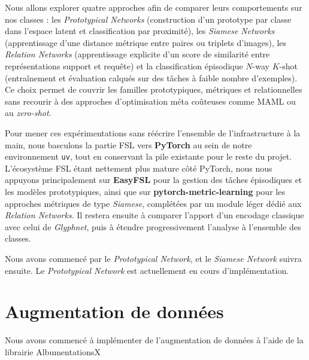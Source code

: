 \documentclass[11pt,a4paper]{article}
\begin{document}
Nous allons explorer quatre approches afin de comparer leurs comportements sur nos classes : les \textit{Prototypical Networks} (construction d'un prototype par classe dans l'espace latent et classification par proximité), les \textit{Siamese Networks} (apprentissage d'une distance métrique entre paires ou triplets d'images), les \textit{Relation Networks} (apprentissage explicite d'un score de similarité entre représentations support et requête) et la classification épisodique $N$-way $K$-shot (entraînement et évaluation calqués sur des tâches à faible nombre d'exemples). Ce choix permet de couvrir les familles prototypiques, métriques et relationnelles sans recourir à des approches d'optimisation méta coûteuses comme MAML ou au \textit{zero-shot}.

Pour mener ces expérimentations sans réécrire l'ensemble de l'infrastructure à la main, nous basculons la partie FSL vers \textbf{PyTorch} au sein de notre environnement \texttt{uv}, tout en conservant la pile existante pour le reste du projet. L'écosystème FSL étant nettement plus mature côté PyTorch, nous nous appuyons principalement sur \textbf{EasyFSL} pour la gestion des tâches épisodiques et les modèles prototypiques, ainsi que sur \textbf{pytorch-metric-learning} pour les approches métriques de type \textit{Siamese}, complétées par un module léger dédié aux \textit{Relation Networks}. Il restera ensuite à comparer l'apport d'un encodage classique avec celui de \textit{Glyphnet}, puis à étendre progressivement l'analyse à l'ensemble des classes.

Nous avons commencé par le \textit{Prototypical Network}, et le \textit{Siamese Network} suivra ensuite. Le \textit{Prototypical Network} est actuellement en cours d'implémentation.

\section{Augmentation de données}

Nous avons commencé à implémenter de l'augmentation de données à l'aide de la librairie AlbumentationsX
\end{document}
